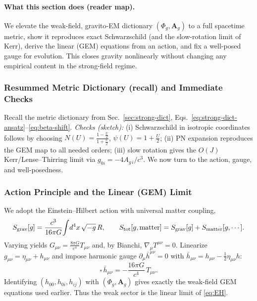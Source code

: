 \paragraph{What this section does (reader map).}
We elevate the weak-field, gravito-EM dictionary $(\Phi_g,\mathbf A_g)$ to a full spacetime metric, show it reproduces exact Schwarzschild (and the slow-rotation limit of Kerr), derive the linear (GEM) equations from an action, and fix a well-posed gauge for evolution. This closes gravity nonlinearly without changing any empirical content in the strong-field regime.

\subsubsection{Resummed Metric Dictionary (recall) and Immediate Checks}
\label{sec:resummed-dict}
Recall the metric dictionary from Sec.~\ref{sec:strong-dict},
Eqs.~\eqref{eq:strong-dict-ansatz}--\eqref{eq:beta-shift}.
\emph{Checks (sketch):} (i) Schwarzschild in isotropic coordinates follows by choosing
$N(U)=\frac{1-\tfrac{U}{2}}{1+\tfrac{U}{2}}$, $\psi(U)=1+\frac{U}{2}$; (ii) PN expansion reproduces the GEM map to all needed orders; (iii) slow rotation gives the $O(J)$ Kerr/Lense--Thirring limit via $g_{0i}=-4A_{g\,i}/c^3$.
We now turn to the action, gauge, and well-posedness.

\subsubsection{Action Principle and the Linear (GEM) Limit}
\label{sec:EH-closure}
\label{sec:action-linear}
We adopt the Einstein–Hilbert action with universal matter coupling,
\begin{equation}
S_{\rm grav}[g]=\frac{c^3}{16\pi G}\!\int \! d^4x\,\sqrt{-g}\,R,\qquad
S_{\rm tot}[g,\text{matter}]=S_{\rm grav}[g]+S_{\rm matter}[g,\cdots].
\label{eq:EH}
\end{equation}
Varying yields $G_{\mu\nu}=\tfrac{8\pi G}{c^4}T_{\mu\nu}$ and, by Bianchi, $\nabla_\mu T^{\mu\nu}=0$.
Linearize $g_{\mu\nu}=\eta_{\mu\nu}+h_{\mu\nu}$ and impose harmonic gauge $\partial_\mu \bar h^{\mu\nu}=0$ with $\bar h_{\mu\nu}\!=\!h_{\mu\nu}-\tfrac12\eta_{\mu\nu}h$:
\begin{equation}
\square\,\bar h_{\mu\nu}=-\frac{16\pi G}{c^4}\,T_{\mu\nu}.
\label{eq:lin_ein}
\end{equation}
Identifying $(h_{00},h_{0i},h_{ij})$ with $(\Phi_g,\mathbf A_g)$ gives exactly the weak-field GEM equations used earlier. Thus the weak sector is the linear limit of \eqref{eq:EH}.

